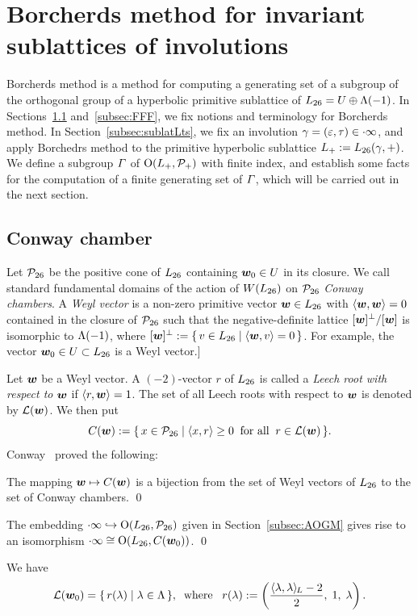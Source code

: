 \documentclass{amsart} %
\begin{document}
\section{Borcherds method for invariant sublattices of  involutions}\label{sec:Borcherds}
%
Borcherds method is a method for computing  a generating set of  
a subgroup of the orthogonal group
of  a hyperbolic primitive sublattice of $L_{26}=U\oplus \Lambda(-1)$.
In Sections~\ref{subsec:ConwayChamber} and~\ref{subsec:FFF},
we fix notions and terminology for  Borcherds method.
In Section~\ref{subsec:sublatLts}, 
we fix an involution
$\gamma=(\varepsilon, \tau)\in \cdot \infty$, and 
apply Borchedrs method to  the primitive hyperbolic sublattice
$L_{+}:=L_{26}(\gamma, +)$.
We define a subgroup $\varGamma$ of $ \mathord{\mathrm{O}}(L_{+}, \mathord{\mathcal{P}}_{+})$
with  finite index, and establish  some facts
for the computation of  a finite generating set of
 $\varGamma$, which will be carried out in the next section.
%
%
\subsection{Conway chamber}\label{subsec:ConwayChamber}
%
Let $\mathord{\mathcal{P}}_{26}$ be the 
positive cone of $L_{26}$ 
containing $\boldsymbol{w}_0\in U$ in its closure.
%
We call standard fundamental domains of the action of $W(L_{26})$ on $\mathord{\mathcal{P}}_{26}$ 
\emph{Conway chambers}.
A \emph{Weyl vector} is a non-zero primitive vector $\boldsymbol{w} \in L_{26}$
with $\langle \boldsymbol{w} , \boldsymbol{w}  \rangle=0$ contained in 
the closure of $\mathord{\mathcal{P}}_{26}$  such that
the negative-definite lattice $[\boldsymbol{w} ]^{\perp}/[\boldsymbol{w} ]$ is isomorphic to $\Lambda(-1)$,
where $[\boldsymbol{w} ]^{\perp}:=\{\,{v\in L_{26}}\mid {\langle \boldsymbol{w}, v \rangle=0} \,\}$.
For example, 
the vector $\boldsymbol{w}_0\in U\subset L_{26}$ is a Weyl vector.]
\par
Let $\boldsymbol{w} $ be a Weyl vector.
A $(-2)$-vector $r$ of $L_{26}$ is called a \emph{Leech root with respect to $\boldsymbol{w} $} if  $\langle r, \boldsymbol{w}  \rangle=1$.
The set of all Leech roots with respect to $\boldsymbol{w} $ is denoted by $\mathord{\mathcal{L}}(\boldsymbol{w} )$.
We then put
\[
\mathord{C}(\boldsymbol{w} ):=\{\,{x\in\mathord{\mathcal{P}}_{26}}\mid {\langle x, r \rangle\ge 0\;\;\textrm{for all}\;\; r\in \mathord{\mathcal{L}}(\boldsymbol{w})} \,\}.
\]
%
Conway~\cite{MR690711} proved the following:
%
\begin{theorem}
The mapping $\boldsymbol{w} \mapsto \mathord{C}(\boldsymbol{w})$ is a bijection from the set of Weyl vectors of $L_{26}$ to
the set of Conway chambers.
\qed
\end{theorem}
%
\begin{corollary}
The embedding $\cdot \infty\hookrightarrow \mathord{\mathrm{O}}(L_{26}, \mathord{\mathcal{P}}_{26})$ given in Section~\ref{subsec:AOGM} 
gives rise to  an isomorphism 
$\cdot \infty\cong  \mathord{\mathrm{O}}(L_{26}, \mathord{C}(\boldsymbol{w}_0))$.
\qed
\end{corollary}
%
%
We have 
\begin{equation}\label{eq:Leechrootlambda}
\mathord{\mathcal{L}}(\boldsymbol{w}_0)=\{\,{r(\lambda)}\mid {\lambda\in \Lambda} \,\},
\;\;\textrm{where}\;\;\; r(\lambda):=\left(\frac{\langle \lambda, \lambda \rangle_{\hskip -1pt L}-2}{2}, \; 1,\; \lambda\right).
\end{equation}
%
%
%
%
\end{document}
